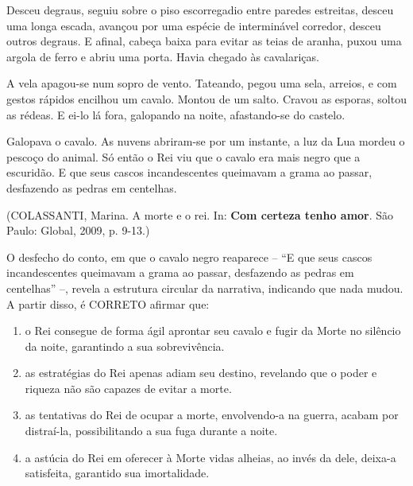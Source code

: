 Desceu degraus, seguiu sobre o piso escorregadio entre paredes estreitas, desceu uma longa escada, avançou por uma espécie de interminável corredor, desceu outros degraus. E afinal, cabeça baixa para evitar as teias de aranha, puxou uma argola de ferro e abriu uma porta. Havia chegado às cavalariças.

A vela apagou-se num sopro de vento. Tateando, pegou uma sela, arreios, e com gestos rápidos encilhou um cavalo. Montou de um salto. Cravou as esporas, soltou as rédeas. E ei-lo lá fora, galopando na noite, afastando-se do castelo.

Galopava o cavalo. As nuvens abriram-se por um instante, a luz da Lua mordeu o pescoço do animal. Só então o Rei viu que o cavalo era mais negro que a escuridão. E que seus cascos incandescentes queimavam a grama ao passar, desfazendo as pedras em centelhas.

\begin{flushright}(COLASSANTI, Marina. A morte e o rei. In: \textbf{Com certeza tenho amor}. São Paulo: Global, 2009, p. 9-13.)\end{flushright}

O desfecho do conto, em que o cavalo negro reaparece -- “E que seus cascos incandescentes queimavam a grama ao passar, desfazendo as pedras em centelhas” --, revela a estrutura circular da narrativa, indicando que nada mudou. A partir disso, é CORRETO afirmar que:
\begin{enumerate}
\item o Rei consegue de forma ágil aprontar seu cavalo e fugir da Morte no silêncio da noite, garantindo a sua sobrevivência.
\item as estratégias do Rei apenas adiam seu destino, revelando que o poder e riqueza não são capazes de evitar a morte.
\item as tentativas do Rei de ocupar a morte, envolvendo-a na guerra, acabam por distraí-la, possibilitando a sua fuga durante a noite.
\item a astúcia do Rei em oferecer à Morte vidas alheias, ao invés da dele, deixa-a satisfeita, garantido sua imortalidade.
\end{enumerate}
